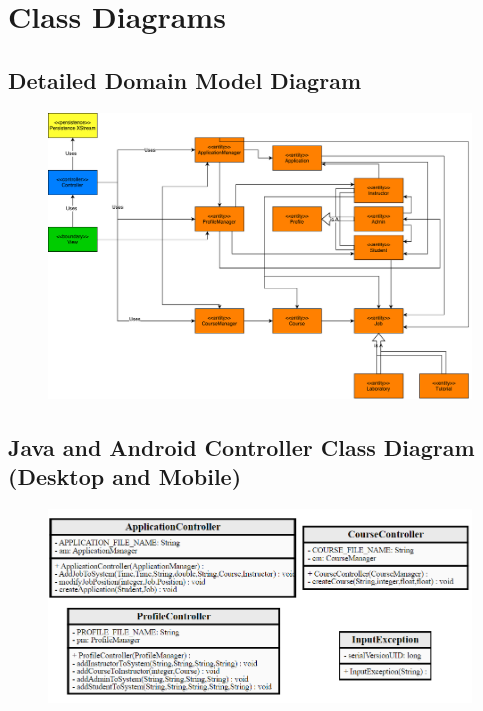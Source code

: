 \documentclass[12pt]{article}
\begin{document}
\section{Class Diagrams}
\subsection{Detailed Domain Model Diagram}
\begin{figure}[H]
	\centering
	\includegraphics[width =1\textwidth]{./ClassDiagrams/DetailedDomainModelDiagram.pdf}
\end{figure}
\subsection{Java and Android Controller Class Diagram (Desktop and Mobile)}
\begin{figure}[H]
	\centering
	\includegraphics[scale=0.95]{./ClassDiagrams/ControllerPackageClassDiagramJava.png}
\end{figure}
\end{document}
